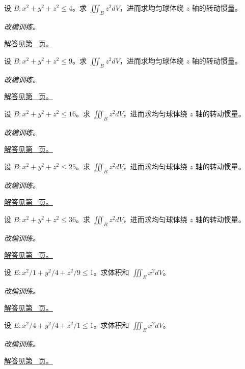 \documentclass[UTF8,12pt,a4paper,fontset=fandol]{ctexart}
\begin{document}
\begin{example}[球内坐标平方的积分]\label{ex:c39q8}
设 $B:x^2+y^2+z^2\le 4$。求 $\iiint_Bz^2dV$，进而求均匀球体绕 $z$ 轴的转动惯量。
\par\textit{改编训练。}\par\hyperref[ans:c39q8]{解答见第~\pageref{ans:c39q8} 页。}
\end{example}
\begin{example}[球内坐标平方的积分]\label{ex:c39q9}
设 $B:x^2+y^2+z^2\le 9$。求 $\iiint_Bz^2dV$，进而求均匀球体绕 $z$ 轴的转动惯量。
\par\textit{改编训练。}\par\hyperref[ans:c39q9]{解答见第~\pageref{ans:c39q9} 页。}
\end{example}
\begin{example}[球内坐标平方的积分]\label{ex:c39q10}
设 $B:x^2+y^2+z^2\le 16$。求 $\iiint_Bz^2dV$，进而求均匀球体绕 $z$ 轴的转动惯量。
\par\textit{改编训练。}\par\hyperref[ans:c39q10]{解答见第~\pageref{ans:c39q10} 页。}
\end{example}
\begin{example}[球内坐标平方的积分]\label{ex:c39q11}
设 $B:x^2+y^2+z^2\le 25$。求 $\iiint_Bz^2dV$，进而求均匀球体绕 $z$ 轴的转动惯量。
\par\textit{改编训练。}\par\hyperref[ans:c39q11]{解答见第~\pageref{ans:c39q11} 页。}
\end{example}
\begin{example}[球内坐标平方的积分]\label{ex:c39q12}
设 $B:x^2+y^2+z^2\le 36$。求 $\iiint_Bz^2dV$，进而求均匀球体绕 $z$ 轴的转动惯量。
\par\textit{改编训练。}\par\hyperref[ans:c39q12]{解答见第~\pageref{ans:c39q12} 页。}
\end{example}
\begin{example}[椭球体积与二次矩]\label{ex:c39q13}
设 $E:x^2/1+y^2/4+z^2/9\le1$。求体积和 $\iiint_Ex^2dV$。
\par\textit{改编训练。}\par\hyperref[ans:c39q13]{解答见第~\pageref{ans:c39q13} 页。}
\end{example}
\begin{example}[椭球体积与二次矩]\label{ex:c39q14}
设 $E:x^2/4+y^2/4+z^2/1\le1$。求体积和 $\iiint_Ex^2dV$。
\par\textit{改编训练。}\par\hyperref[ans:c39q14]{解答见第~\pageref{ans:c39q14} 页。}
\end{example}
\end{document}
